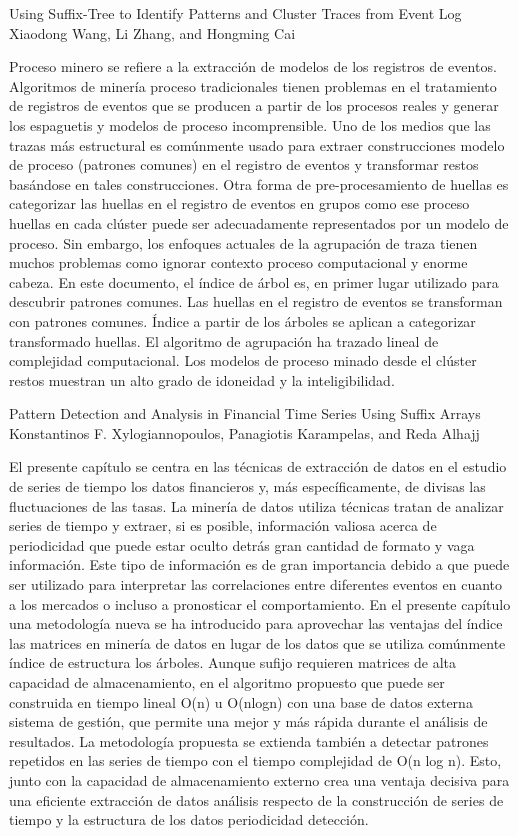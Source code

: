 Using Suffix-Tree to Identify Patterns and Cluster Traces from Event Log
Xiaodong Wang, Li Zhang, and Hongming Cai

Proceso minero se refiere a la extracción de modelos de los registros de eventos. Algoritmos de minería proceso tradicionales tienen problemas en el tratamiento de registros de eventos que se producen a partir de los procesos reales y generar los espaguetis y modelos de proceso incomprensible. Uno de los medios que las trazas más estructural es comúnmente usado para extraer construcciones modelo de proceso (patrones comunes) en el registro de eventos y transformar restos basándose en tales construcciones. Otra forma de pre-procesamiento de huellas es categorizar las huellas en el registro de eventos en grupos como ese proceso huellas en cada clúster puede ser adecuadamente representados por un modelo de proceso. Sin embargo, los enfoques actuales de la agrupación de traza tienen muchos problemas como ignorar contexto proceso computacional y enorme cabeza. En este documento, el índice de árbol es, en primer lugar utilizado para descubrir patrones comunes. Las huellas en el registro de eventos se transforman con patrones comunes. Índice a partir de los árboles se aplican a categorizar transformado huellas. El algoritmo de agrupación ha trazado lineal de complejidad computacional. Los modelos de proceso minado desde el clúster restos muestran un alto grado de idoneidad y la inteligibilidad.



Pattern Detection and Analysis in Financial Time Series Using Suffix Arrays
Konstantinos F. Xylogiannopoulos, Panagiotis Karampelas, and Reda Alhajj

El presente capítulo se centra en las técnicas de extracción de datos en el estudio de series de tiempo los datos financieros y, más específicamente, de divisas las fluctuaciones de las tasas. La minería de datos utiliza técnicas tratan de analizar series de tiempo y extraer, si es posible, información valiosa acerca de periodicidad que puede estar oculto detrás gran cantidad de formato y vaga información. Este tipo de información es de gran importancia debido a que puede ser utilizado para interpretar las correlaciones entre diferentes eventos en cuanto a los mercados o incluso a pronosticar el comportamiento. En el presente capítulo una metodología nueva se ha introducido para aprovechar las ventajas del índice las matrices en minería de datos en lugar de los datos que se utiliza comúnmente índice de estructura los árboles. Aunque sufijo requieren matrices de alta capacidad de almacenamiento, en el algoritmo propuesto que puede ser construida en tiempo lineal O(n) u O(nlogn) con una base de datos externa sistema de gestión, que permite una mejor y más rápida durante el análisis de resultados. La metodología propuesta se extienda también a detectar patrones repetidos en las series de tiempo con el tiempo complejidad de O(n log n).  Esto, junto con la capacidad de almacenamiento externo crea una ventaja decisiva para una eficiente extracción de datos análisis respecto de la construcción de series de tiempo y la estructura de los datos periodicidad detección.



